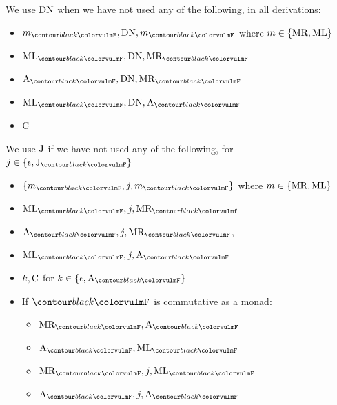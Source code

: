 \noindent We use $\text{DN}$ when we have not used any of the following, in all
derivations:
\begin{multicols}{2}
	\begin{itemize}
		\item $m_{\f{F}}, \combDN, m_{\f{F}}$ where
		      $m \in \{\text{MR}, \text{ML}\}$
		\item $\combML_{\f{F}}, \combDN, \combMR_{\f{F}}$
		\item $\combA_{\f{F}}, \combDN, \combMR_{\f{F}}$
		\item $\combML_{\f{F}}, \combDN, \combA_{\f{F}}$
		\item $\text{C}$
	\end{itemize}
\end{multicols}
\noindent We use $\text{J}$ if we have not used any of the following,
for $j \in \{\epsilon, \combJ_{\f{F}}\}$
\begin{multicols}{2}
	\begin{itemize}
		\item $\left\{m_{\f{F}}, j, m_{\f{F}}\right\}$ where
		      $m \in \{\text{MR}, \text{ML}\}$
		\item $\combML_{\f{F}}, j, \combMR_{\f{f}}$
		\item $\combA_{\f{F}}, j, \combMR_{\f{F}}$,
		\item $\combML_{\f{F}}, j, \combA_{\f{F}}$
		\item $k, \text{C}$ for $k \in \{\epsilon, \combA_{\f{F}}\}$
		\item If $\f{F}$ is commutative as a monad:
		      \begin{itemize}
			      \item $\combMR_{\f{F}}, \combA_{\f{F}}$
			      \item $\combA_{\f{F}}, \combML_{\f{F}}$
			      \item $\combMR_{\f{F}}, j, \combML_{\f{F}}$
			      \item $\combA_{\f{F}}, j, \combA_{\f{F}}$
		      \end{itemize}
	\end{itemize}
\end{multicols}

